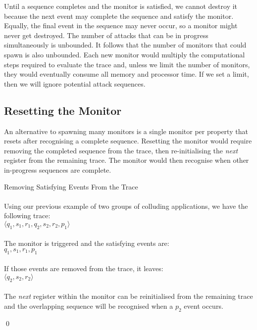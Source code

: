 Until a sequence completes and the monitor is satisfied, we cannot destroy it because the next event may complete the sequence and satisfy the monitor.  Equally, the final event in the sequence may never occur, so a monitor might never get destroyed.  The number of attacks that can be in progress simultaneously is unbounded.  It follows that the number of monitors that could spawn is also unbounded.  Each new monitor would multiply the computational steps required to evaluate the trace and, unless we limit the number of monitors, they would eventually consume all memory and processor time.  If we set a limit, then we will ignore potential attack sequences.

\subsection{Resetting the Monitor}
\label{subsec:ResettingTheMonitor}

An alternative to spawning many monitors is a single monitor per property that resets after recognising a complete sequence.  Resetting the monitor would require removing the completed sequence from the trace, then re-initialising the \textit{next} register from the remaining trace.  The monitor would then recognise when other in-progress sequences are complete.

\begin{myEx} Removing Satisfying Events From the Trace\\
\\
\noindent
Using our previous example of two groups of colluding applications, we have the following trace:\\
$\langle q_1, s_1, r_1, q_2, s_2, r_2, p_1 \rangle$\\
\\
\noindent
The monitor is triggered and the satisfying events are:\\
$q_1, s_1, r_1, p_1$\\
\\
\noindent
If those events are removed from the trace, it leaves:\\
$\langle q_2, s_2, r_2 \rangle$\\
\\
\noindent
The \textit{next} register within the monitor can be reinitialised from the remaining trace and the overlapping sequence will be recognised when a $p_2$ event occurs.

\qed
\end{myEx}

